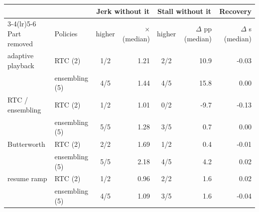 \begin{tabular}{l l cr cr r}
\toprule
 & & \multicolumn{2}{c}{Jerk without it} & \multicolumn{2}{c}{Stall without it} & Recovery \\
\cmidrule(lr){3-4}\cmidrule(lr){5-6}
Part removed & Policies & higher & $\times$ (median) & higher & $\Delta$ pp (median) & $\Delta$ s (median) \\
\midrule
adaptive playback & RTC (2) & 1/2 & 1.21 & 2/2 & 10.9 & -0.03 \\
 & ensembling (5) & 4/5 & 1.44 & 4/5 & 15.8 & 0.00 \\
\addlinespace
RTC / ensembling & RTC (2) & 1/2 & 1.01 & 0/2 & -9.7 & -0.13 \\
 & ensembling (5) & 5/5 & 1.28 & 3/5 & 0.7 & 0.00 \\
\addlinespace
Butterworth & RTC (2) & 2/2 & 1.69 & 1/2 & 0.4 & -0.01 \\
 & ensembling (5) & 5/5 & 2.18 & 4/5 & 4.2 & 0.02 \\
\addlinespace
resume ramp & RTC (2) & 1/2 & 0.96 & 2/2 & 1.6 & 0.02 \\
 & ensembling (5) & 4/5 & 1.09 & 3/5 & 1.6 & -0.04 \\
\bottomrule
\end{tabular}
